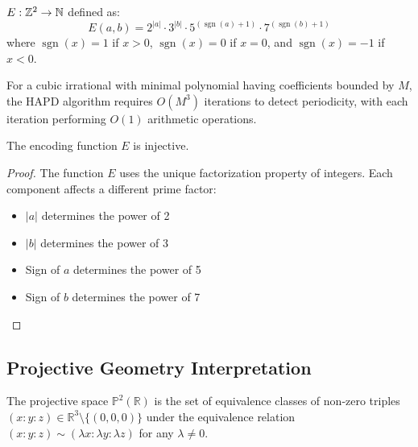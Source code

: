 \begin{definition}\label{def:encoding}
$E : \mathbb{Z}^2 \to \mathbb{N}$ defined as:
\begin{equation}
E(a, b) = 2^{|a|} \cdot 3^{|b|} \cdot 5^{(\operatorname{sgn}(a)+1)} \cdot 7^{(\operatorname{sgn}(b)+1)}
\end{equation}
where $\operatorname{sgn}(x) = 1$ if $x > 0$, $\operatorname{sgn}(x) = 0$ if $x = 0$, and $\operatorname{sgn}(x) = -1$ if $x < 0$.
\end{definition}

\begin{proposition}\label{prop:complexity}
For a cubic irrational with minimal polynomial having coefficients bounded by $M$, the HAPD algorithm requires $O(M^3)$ iterations to detect periodicity, with each iteration performing $O(1)$ arithmetic operations.
\end{proposition}

\begin{lemma}\label{lem:encoding_injective}
The encoding function $E$ is injective.
\end{lemma}

\begin{proof}
The function $E$ uses the unique factorization property of integers. Each component affects a different prime factor:
\begin{itemize}
    \item $|a|$ determines the power of 2
    \item $|b|$ determines the power of 3
    \item Sign of $a$ determines the power of 5
    \item Sign of $b$ determines the power of 7
\end{itemize}
\end{proof}

\subsection{Projective Geometry Interpretation}

\begin{definition}
The projective space $\mathbb{P}^2(\mathbb{R})$ is the set of equivalence classes of non-zero triples $(x : y : z) \in \mathbb{R}^3 \setminus \{(0,0,0)\}$ under the equivalence relation $(x : y : z) \sim (\lambda x : \lambda y : \lambda z)$ for any $\lambda \neq 0$.
\end{definition}

